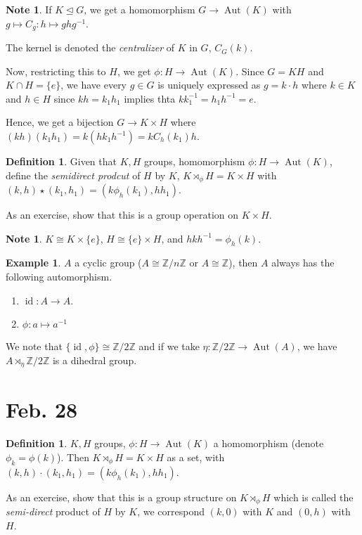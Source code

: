 \documentclass{amsart}
\theoremstyle{definition}
\newtheorem{definition}[thm]{Definition}
\newtheorem{example}[thm]{Example}
\newtheorem{note}[thm]{Note}
\newcommand{\Z}{\mathbb Z}
\DeclareMathOperator{\id}{id}
\DeclareMathOperator{\Aut}{Aut}
\begin{document}
\begin{note}
If $K\unlhd G$, we get a homomorphism $G\to \Aut(K)$ with $g\mapsto C_g:h\mapsto ghg^{-1}$.

The kernel is denoted the \emph{centralizer} of $K$ in $G$, $C_G(k)$.
\end{note}

Now, restricting this to $H$, we get $\phi: H\to \Aut(K)$. Since $G=KH$ and $K\cap H=\{e\}$, we have every $g\in G$ is uniquely expressed as $g=k\cdot h$ where $k\in K$ and $h\in H$ since  $kh=k_1h_1$ implies thta $kk_1^{-1}=h_1h^{-1}=e$.

Hence, we get a bijection $G\to K\times H$ where $(kh)(k_1h_1)=k(hk_1h^{-1})=kC_h(k_1)h$.

\begin{definition}
	Given that $K,H$ groups, homomorphism $\phi:H\to \Aut(K)$, define the \emph{semidirect prodcut} of $H$ by $K$, $K\rtimes_\phi H=K\times H$ with $(k,h)\star (k_1,h_1)=(k\phi_{h}(k_1),hh_1)$.
\end{definition}
As an exercise, show that this is a group operation on $K\times H$.
\begin{note}
	$K\cong K\times\{e\}$, $H\cong \{e\}\times H$, and $hkh^{-1}=\phi_{h}(k)$.
\end{note}

\begin{example}
	$A$ a cyclic group ($A\cong\Z/n\Z$ or $A\cong \Z$), then $A$ always has the following automorphism.
	\begin{enumerate}
		\item $\id: A\to A$.
		\item $\phi:a\mapsto a^{-1}$
	\end{enumerate}
	
	We note that $\{\id, \phi\}\cong \Z/2\Z$ and if we take $\eta:\Z/2\Z\to \Aut(A)$, we have $A\rtimes_\eta \Z/2\Z$ is a dihedral group. 
\end{example}

\section{Feb. 28}
\begin{definition}
	$K,H$ groups, $\phi:H\to \Aut(K)$ a homomorphism (denote $\phi_k=\phi(k)$). Then $K\rtimes_\phi H=K\times H$ as a set, with $(k,h)\cdot(k_1,h_1)=(k\phi_h(k_1),hh_1)$.
\end{definition}
As an exercise, show that this is a group structure on $K\rtimes_\phi H$ which is called the \emph{semi-direct} product of $H$ by $K$, we correspond $(k,0)$ with $K$ and $(0,h)$ with $H$.
\end{document}
